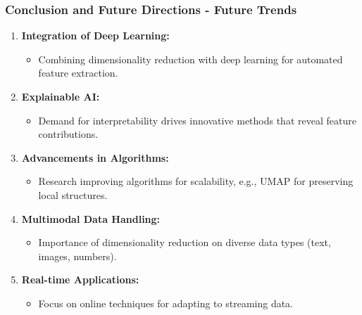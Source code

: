 \documentclass[aspectratio=169]{beamer}
\begin{document}
\begin{frame}[fragile]
  \frametitle{Conclusion and Future Directions - Future Trends}
  \begin{enumerate}
    \item \textbf{Integration of Deep Learning:}
    \begin{itemize}
      \item Combining dimensionality reduction with deep learning for automated feature extraction.
    \end{itemize}
    
    \item \textbf{Explainable AI:}
    \begin{itemize}
      \item Demand for interpretability drives innovative methods that reveal feature contributions.
    \end{itemize}
    
    \item \textbf{Advancements in Algorithms:}
    \begin{itemize}
      \item Research improving algorithms for scalability, e.g., UMAP for preserving local structures.
    \end{itemize}
    
    \item \textbf{Multimodal Data Handling:}
    \begin{itemize}
      \item Importance of dimensionality reduction on diverse data types (text, images, numbers).
    \end{itemize}
    
    \item \textbf{Real-time Applications:}
    \begin{itemize}
      \item Focus on online techniques for adapting to streaming data.
    \end{itemize}
  \end{enumerate}
\end{frame}
\end{document}
